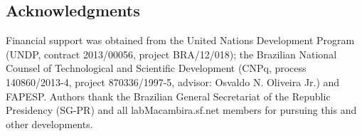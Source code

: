 \documentclass[a4paper, 11pt]{article} %
\begin{document}
\subsection*{Acknowledgments}
Financial support was obtained from 
the United Nations Development Program 
(UNDP, contract 2013/00056, project BRA/12/018);
the Brazilian National Counsel of Technological 
and Scientific Development (CNPq, process 140860/2013-4, project 870336/1997-5,
advisor: Osvaldo N. Oliveira Jr.) and FAPESP.
Authors thank
the Brazilian 
General Secretariat of the Republic Presidency (SG-PR) and 
all
labMacambira.sf.net members for pursuing this and other developments.

%
%



\end{document}
